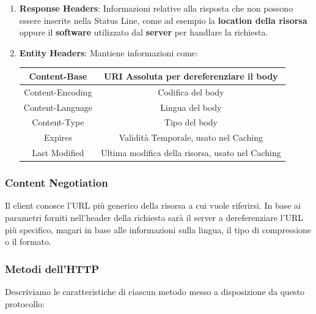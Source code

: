 \documentclass{article}
\begin{document}
\begin{enumerate}
\begin{enumerate}
        \vspace*{5px}
        
        \item \textbf{Response Headers}: Informazioni relative alla risposta che non possono essere
        inserite nella Status Line, come ad esempio la \textbf{location della risorsa} oppure il \textbf{software} utilizzato dal
        \textbf{server} per handlare la richiesta.
        \newpage
        \item \textbf{Entity Headers}: Mantiene informazioni come:
        
        \begin{center}
        \begin{tabular}{ |c|c| } 
        \hline
        Content-Base & URI Assoluta per dereferenziare il body \\ 
        \hline
        Content-Encoding & Codifica del body \\ 
        \hline
        Content-Language & Lingua del body \\ 
        \hline
        Content-Type & Tipo del body \\ 
        \hline
        Expires & Validità Temporale, usato nel Caching \\ 
        \hline
        Last Modified & Ultima modifica della risorsa, usato nel Caching \\ 
        \hline
        \end{tabular}
        \end{center}

    \end{enumerate}


\end{enumerate}

\subsubsection{Content Negotiation}

Il client conosce l'URL più generico della risorsa a cui vuole riferirsi. In base ai parametri forniti nell'header della richiesta
sarà il server a dereferenziare l'URL più specifico, magari in base alle informazioni sulla lingua, il tipo di compressione o il formato.

\subsubsection{Metodi dell'HTTP}

Descriviamo le caratteristiche di ciascun metodo messo a disposizione da questo protocollo:
\end{document}

